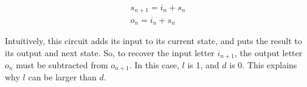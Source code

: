 \documentclass[journal]{IEEEtran}
\begin{document}
\begin{equation}
\begin{array}{c}
s_{n+1}=i_n+s_n\\
o_{n}=i_n+s_n
\end{array}
\end{equation}

Intuitively,
this circuit adds its input to its current state,
and puts the result to its output and next state.
So,
to recover the input letter $i_{n+1}$,
the output letter $o_n$ must be subtracted from $o_{n+1}$.
In this case,
$l$ is 1,
and $d$ is 0.
This explains why $l$ can be larger than $d$.





%





%
%
\end{document}
